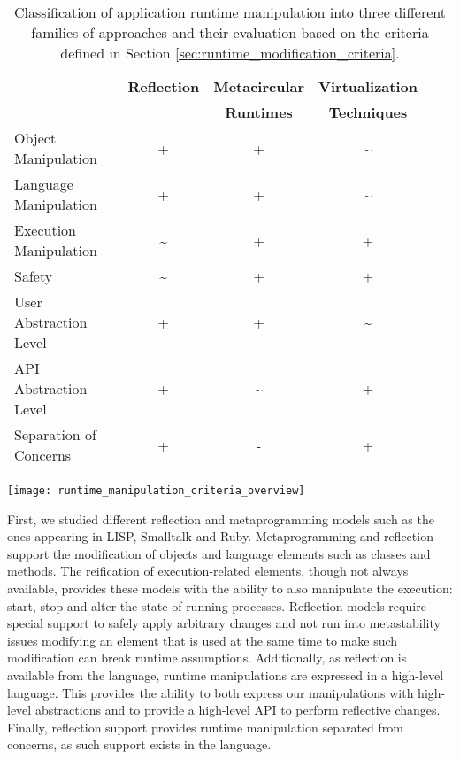 \begin{table}[ht]
 \small
 	\centering
 	\begin{tabular}{lccccc}
	
\toprule
 			& \textbf{Reflection}
 			& \textbf{Metacircular}
			& \textbf{Virtualization}\\
 			& \textbf{}
 			& \textbf{Runtimes}
			& \textbf{Techniques}\\
 \toprule

		Object Manipulation
 			& + & + & \textasciitilde \\
		\hline
		Language
		Manipulation
 			& + & + & \textasciitilde\\
		\hline
		Execution Manipulation
 			& \textasciitilde & + & + \\
		\hline
		Safety
 			& \textasciitilde & + & + \\
		\hline
		User Abstraction
		Level
 			& + & + & \textasciitilde \\
		\hline
		API Abstraction
		Level
 			& + & \textasciitilde & + \\
		\hline
		Separation of Concerns
 			& + & - & +\\
 	 \bottomrule
 	\end{tabular}
	\texttt{[image: runtime\_manipulation\_criteria\_overview]}
 	\caption{Classification of application runtime manipulation into three different families of approaches and their evaluation based on the criteria defined in Section \ref{sec:runtime_modification_criteria}.}
 	\label{tb:comparison_runtime_manipulation}
 \end{table}

First, we studied different reflection and metaprogramming models such as the ones appearing in LISP, Smalltalk and Ruby. Metaprogramming and reflection support the modification of objects and language elements such as classes and methods. The reification of execution-related elements, though not always available, provides these models with the ability to also manipulate the execution: start, stop and alter the state of running processes. Reflection models require special support to safely apply arbitrary changes and not run into metastability issues \ie modifying an element that is used at the same time to make such modification can break runtime assumptions. Additionally, as reflection is available from the language, runtime manipulations are expressed in a high-level language. This provides the ability to both express our manipulations with high-level abstractions and to provide a high-level API to perform reflective changes. Finally, reflection support provides runtime manipulation separated from \VM concerns, as such support exists in the language.


